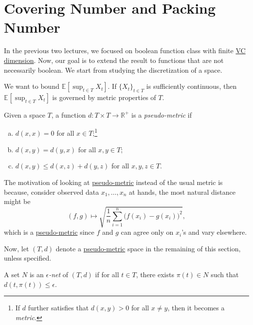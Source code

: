 \section{Covering Number and Packing Number}
In the previous two lectures, we focused on boolean function class with finite \hyperref[def:VC-dimension]{VC dimension}. Now, our goal is to extend the result to functions that are not necessarily boolean. We start from studying the discretization of a space.

\begin{intuition}
  We want to bound \(\mathbb{E}_{}\left[\sup _{t\in T } X_t \right]\). If \(\{ X_t \} _{t\in T}\) is sufficiently continuous, then \(\mathbb{E}_{}\left[\sup _{t\in T} X_t\right] \) is governed by metric properties of \(T\).
\end{intuition}

\begin{definition}\label{def:pseudo-metric}
  Given a space \(T\), a function \(d\colon T \times T \to \mathbb{R} ^+\) is a \emph{pseudo-metric} if
  \begin{enumerate}[(a)]
    \item \(d(x, x) = 0\) for all \(x \in T\);\footnote{If \(d\) further satisfies that \(d(x, y) > 0\) for all \(x \neq y\), then it becomes a \emph{metric}.}
    \item \(d(x, y) = d(y, x)\) for all \(x, y\in T\);
    \item \(d(x, y) \leq d(x, z) + d(y, z)\) for all \(x, y, z\in T\).
  \end{enumerate}
\end{definition}

\begin{note}
  The motivation of looking at \hyperref[def:pseudo-metric]{pseudo-metric} instead of the usual metric is because, consider observed data \(x_1, \dots , x_n\) at hands, the most natural distance might be
  \[
    (f, g) \mapsto \sqrt{\frac{1}{n} \sum_{i=1}^{n} \big(f(x_i) - g(x_i)\big)^2},
  \]
  which is a \hyperref[def:pseudo-metric]{pseudo-metric} since \(f\) and \(g\) can agree only on \(x_i\)'s and vary elsewhere.
\end{note}

Now, let \((T, d)\) denote a \hyperref[def:pseudo-metric]{pseudo-metric} space in the remaining of this section, unless specified.

\begin{definition}\label{def:eps-net}
  A set \(N\) is an \emph{\(\epsilon \)-net} of \((T, d)\) if for all \(t\in T\), there exists \(\pi (t) \in N\) such that \(d(t, \pi (t)) \leq \epsilon \).
\end{definition}

